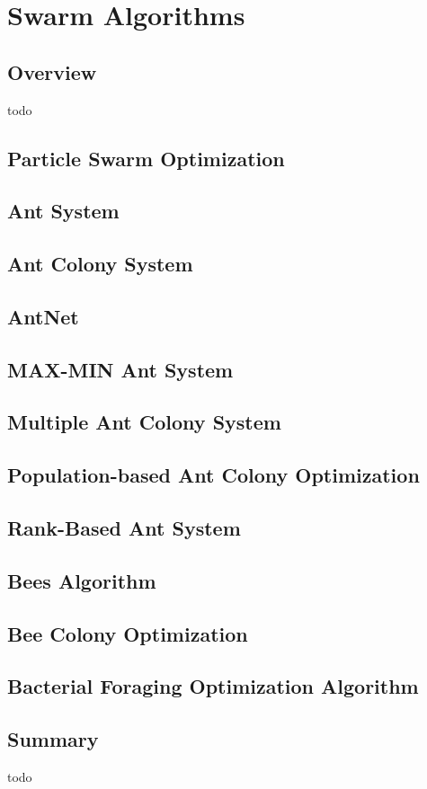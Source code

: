 


\chapter{Swarm Algorithms}
\label{ch:swarm}

\section{Overview}
todo





\section{Particle Swarm Optimization}

\section{Ant System}
\section{Ant Colony System}
\section{AntNet}
\section{MAX-MIN Ant System}
\section{Multiple Ant Colony System}
\section{Population-based Ant Colony Optimization}
\section{Rank-Based Ant System}

\section{Bees Algorithm}
\section{Bee Colony Optimization}


\section{Bacterial Foraging Optimization Algorithm}


\section{Summary}
todo
